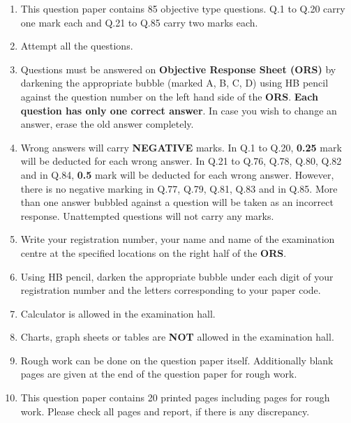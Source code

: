 \documentclass[journal,12pt,onecolumn]{IEEEtran}
\theoremstyle{remark}
\begin{document}
\begin{enumerate}[leftmargin=2em,label=\arabic*.]
\item This question paper contains 85 objective type questions. Q.1 to Q.20 carry one mark each and Q.21 to Q.85 carry two marks each.



\item Attempt all the questions.


\item Questions must be answered on \textbf{Objective Response Sheet (ORS)} by darkening the appropriate bubble (marked A, B, C, D) using HB pencil against the question number on the left hand side of the \textbf{ORS}. \textbf{Each question has only one correct answer}. In case you wish to change an answer, erase the old answer completely.


\item Wrong answers will carry \textbf{NEGATIVE} marks. In Q.1 to Q.20, \textbf{0.25} mark will be deducted for each wrong answer. In Q.21 to Q.76, Q.78, Q.80, Q.82 and in Q.84, \textbf{0.5} mark will be deducted for each wrong answer. However, there is no negative marking in Q.77, Q.79, Q.81, Q.83 and in Q.85. More than one answer bubbled against a question will be taken as an incorrect response. Unattempted questions will not carry any marks.



\item Write your registration number, your name and name of the examination centre at the specified locations on the right half of the \textbf{ORS}.



\item Using HB pencil, darken the appropriate bubble under each digit of your registration number and the letters corresponding to your paper code.



\item Calculator is allowed in the examination hall.



\item Charts, graph sheets or tables are \textbf{NOT} allowed in the examination hall.



\item Rough work can be done on the question paper itself. Additionally blank pages are given at the end of the question paper for rough work.



\item This question paper contains 20 printed pages including pages for rough work. Please check all pages and report, if there is any discrepancy.
\end{enumerate}
\end{document}
